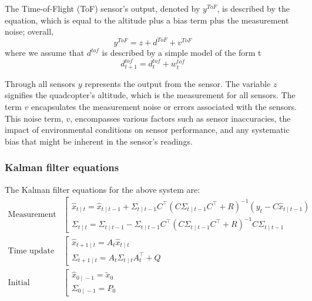\documentclass{article}
\begin{document}
    The Time-of-Flight (ToF) sensor's output, denoted by \( y^{ToF} \), is described by the equation, which is equal to the altitude plus a bias term plus the measurement noise; overall,
    \begin{equation}
    y^{ToF} = z + d^{ToF} + v^{ToF}
    \end{equation}
    where we assume that \(d^{tof}\) is described by a simple model of the form t
    \begin{equation}
    d^{tof}_{t+1} = d^{tof}_t + w^{tof}_t
    \end{equation}

    Through all sensors \( y \) represents the output from the sensor. The variable \( z \) signifies the quadcopter's altitude, which is the measurement for all sensors. The term \( v \) encapsulates the measurement noise or errors associated with the sensors. This noise term, \( v \), encompasses various factors such as sensor inaccuracies, the impact of environmental conditions on sensor performance, and any systematic bias that might be inherent in the sensor's readings.



\subsubsection*{Kalman filter equations}
The Kalman filter equations for the above system are:
\begin{align}
    \text{Measurement} &
    \left[
    \begin{array}{l}
      \hat{x}_{t{}\mid{}t}
      {}={}
      \hat{x}_{t{}\mid{}t-1}
      {}+{}
      \Sigma_{t{}\mid{}t-1}C^\intercal
      (C\Sigma_{t{}\mid{}t-1}C^\intercal + R)^{-1}(y_t - C\hat{x}_{t{}\mid{}t-1})
      \\
      \Sigma_{t{}\mid{}t}
      {}={}
      \Sigma_{t{}\mid{}t-1}
      {}-{}
      \Sigma_{t{}\mid{}t-1}C^\intercal
      (C\Sigma_{t{}\mid{}t-1}C^\intercal + R)^{-1}
      C\Sigma_{t{}\mid{}t-1}
    \end{array}
    \right.
    \\
    \text{Time update}        &
    \left[
    \begin{array}{l}
      \hat{x}_{t+1{}\mid{}t}
      {}={}
      A_t \hat{x}_{t{}\mid{}t}
      \\
      \Sigma_{t+1{}\mid{}t}
      {}={}
      A_t \Sigma_{t{}\mid{}t} A_t^\intercal + Q
    \end{array}
    \right.
    \\
    \text{Initial conditions} &
    \left[
    \begin{array}{l}
      \hat{x}_{0{}\mid{}-1}
      {}={}
      \tilde{x}_0
      \\
      \Sigma_{0{}\mid{}-1}
      {}={}
      P_0
    \end{array}
    \right.
  \end{align}
\end{document}
